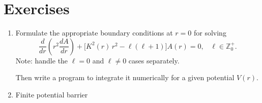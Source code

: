 \documentclass[pra,12pt]{revtex4}
\begin{document}
\section*{Exercises}

\begin{enumerate}
\item \label{ex:numerical_spherical}
  Formulate the appropriate boundary conditions at $r = 0$ for solving
$$\frac{d}{dr}\left(r^2\frac{dA}{dr}\right) + \Big[K^2(r)\, r^2 - \ell(\ell+1)\Big] A(r) = 0, \;\;\;\ell \in \mathbb{Z}_0^+.$$
  Note: handle the $\ell = 0$ and $\ell \ne 0$ cases separately.

  Then write a program to integrate it numerically for a given
  potential $V(r)$.

\item \label{ex:spherical_barrier}
  Finite potential barrier
\end{enumerate}
\end{document}
